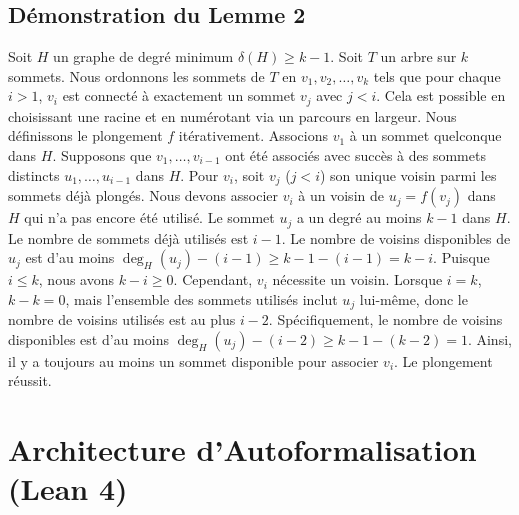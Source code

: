 \documentclass[11pt,a4paper]{article}
\begin{document}
\subsection{D\'emonstration du Lemme 2}
Soit $H$ un graphe de degr\'e minimum $\delta(H) \geq k-1$.
Soit $T$ un arbre sur $k$ sommets. Nous ordonnons les sommets de $T$ en $v_1, v_2, \dots, v_k$ tels que pour chaque $i > 1$, $v_i$ est connect\'e \`a exactement un sommet $v_j$ avec $j < i$. Cela est possible en choisissant une racine et en num\'erotant via un parcours en largeur.
Nous d\'efinissons le plongement $f$ it\'erativement.
Associons $v_1$ \`a un sommet quelconque dans $H$.
Supposons que $v_1, \dots, v_{i-1}$ ont \'et\'e associ\'es avec succ\`es \`a des sommets distincts $u_1, \dots, u_{i-1}$ dans $H$.
Pour $v_i$, soit $v_j$ ($j < i$) son unique voisin parmi les sommets d\'ej\`a plong\'es.
Nous devons associer $v_i$ \`a un voisin de $u_j = f(v_j)$ dans $H$ qui n'a pas encore \'et\'e utilis\'e.
Le sommet $u_j$ a un degr\'e au moins $k-1$ dans $H$.
Le nombre de sommets d\'ej\`a utilis\'es est $i-1$.
Le nombre de voisins disponibles de $u_j$ est d'au moins $\deg_H(u_j) - (i-1) \geq k-1 - (i-1) = k - i$.
Puisque $i \leq k$, nous avons $k - i \geq 0$. Cependant, $v_i$ n\'ecessite un voisin. Lorsque $i=k$, $k-k = 0$, mais l'ensemble des sommets utilis\'es inclut $u_j$ lui-m\^eme, donc le nombre de voisins utilis\'es est au plus $i-2$.
Sp\'ecifiquement, le nombre de voisins disponibles est d'au moins $\deg_H(u_j) - (i-2) \geq k-1 - (k-2) = 1$.
Ainsi, il y a toujours au moins un sommet disponible pour associer $v_i$. Le plongement r\'eussit.

\section{Architecture d'Autoformalisation (Lean 4)}
\end{document}
